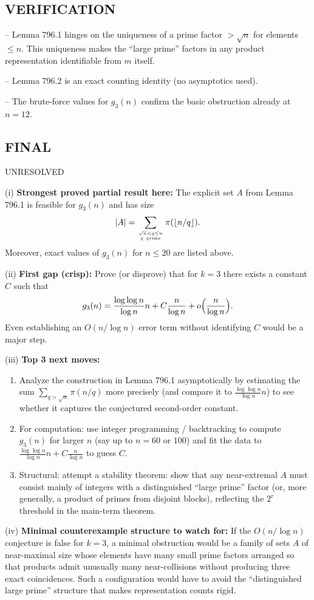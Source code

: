 \subsection*{VERIFICATION}
-- Lemma 796.1 hinges on the uniqueness of a prime factor $>\sqrt n$ for elements $\le n$.
This uniqueness makes the ``large prime'' factors in any product representation identifiable from $m$ itself.

-- Lemma 796.2 is an exact counting identity (no asymptotics used).

-- The brute-force values for $g_3(n)$ confirm the basic obstruction already at $n=12$.

\subsection*{FINAL}
UNRESOLVED

(i) \textbf{Strongest proved partial result here:} The explicit set $A$ from Lemma 796.1 is feasible for $g_3(n)$ and has size
\[|A|=\sum_{\sqrt n<q\le n\atop q\ \mathrm{prime}} \pi(\lfloor n/q\rfloor).
\]
Moreover, exact values of $g_3(n)$ for $n\le 20$ are listed above.

(ii) \textbf{First gap (crisp):} Prove (or disprove) that for $k=3$ there exists a constant $C$ such that
\[
 g_3(n)=\frac{\log\log n}{\log n}n + C\frac{n}{\log n}+o\Bigl(\frac{n}{\log n}\Bigr).
\]
Even establishing an $O(n/\log n)$ error term without identifying $C$ would be a major step.

(iii) \textbf{Top 3 next moves:}
\begin{enumerate}
\item Analyze the construction in Lemma 796.1 asymptotically by estimating the sum $\sum_{q>\sqrt n} \pi(n/q)$ more precisely (and compare it to $\frac{\log\log n}{\log n}n$) to see whether it captures the conjectured second-order constant.
\item For computation: use integer programming / backtracking to compute $g_3(n)$ for larger $n$ (say up to $n=60$ or $100$) and fit the data to $\frac{\log\log n}{\log n}n + C\frac{n}{\log n}$ to guess $C$.
\item Structural: attempt a stability theorem: show that any near-extremal $A$ must consist mainly of integers with a distinguished ``large prime'' factor (or, more generally, a product of primes from disjoint blocks), reflecting the $2^r$ threshold in the main-term theorem.
\end{enumerate}

(iv) \textbf{Minimal counterexample structure to watch for:} If the $O(n/\log n)$ conjecture is false for $k=3$, a minimal obstruction would be a family of sets $A$ of near-maximal size whose elements have many small prime factors arranged so that products admit unusually many near-collisions without producing three exact coincidences. Such a configuration would have to avoid the ``distinguished large prime'' structure that makes representation counts rigid.


